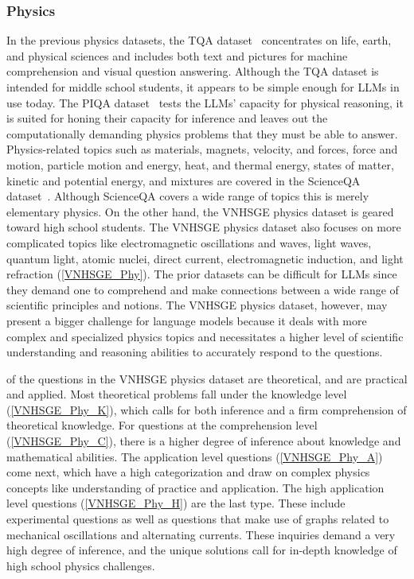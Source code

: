 \documentclass{article}
\begin{document}
{	
	\subsubsection{Physics}
	
	In the previous physics datasets, the TQA dataset~\cite{kembhavi2017you} concentrates on life, earth, and physical sciences and includes both text and pictures for machine comprehension and visual question answering. Although the TQA dataset is intended for middle school students, it appears to be simple enough for LLMs in use today. The PIQA dataset~\cite{bisk2020piqa} tests the LLMs' capacity for physical reasoning, it is suited for honing their capacity for inference and leaves out the computationally demanding physics problems that they must be able to answer. Physics-related topics such as materials, magnets, velocity, and forces, force and motion, particle motion and energy, heat, and thermal energy, states of matter, kinetic and potential energy, and mixtures are covered in the ScienceQA dataset~\cite{lu2022learn}. Although ScienceQA covers a wide range of topics this is merely elementary physics. On the other hand, the VNHSGE physics dataset is geared toward high school students. The VNHSGE physics dataset also focuses on more complicated topics like electromagnetic oscillations and waves, light waves, quantum light, atomic nuclei, direct current, electromagnetic induction, and light refraction (\ref{VNHSGE_Phy}). The prior datasets can be difficult for LLMs since they demand one to comprehend and make connections between a wide range of scientific principles and notions. The VNHSGE physics dataset, however, may present a bigger challenge for language models because it deals with more complex and specialized physics topics and necessitates a higher level of scientific understanding and reasoning abilities to accurately respond to the questions.
	
	 of the questions in the VNHSGE physics dataset are theoretical, and  are practical and applied. Most theoretical problems fall under the knowledge level (\ref{VNHSGE_Phy_K}), which calls for both inference and a firm comprehension of theoretical knowledge. For questions at the comprehension level (\ref{VNHSGE_Phy_C}), there is a higher degree of inference about knowledge and mathematical abilities. The application level questions (\ref{VNHSGE_Phy_A}) come next, which have a high categorization and draw on complex physics concepts like understanding of practice and application. The high application level questions (\ref{VNHSGE_Phy_H}) are the last type. These include experimental questions as well as questions that make use of graphs related to mechanical oscillations and alternating currents. These inquiries demand a very high degree of inference, and the unique solutions call for in-depth knowledge of high school physics challenges.
	
}
\end{document}
